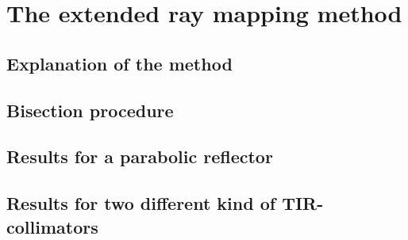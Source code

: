 \chapter{The extended ray mapping method}
\label{chap:raymapping2}

\section{Explanation of the method}
\section{Bisection procedure}
\section{Results for a parabolic reflector}
\section{Results for two different kind of TIR-collimators}